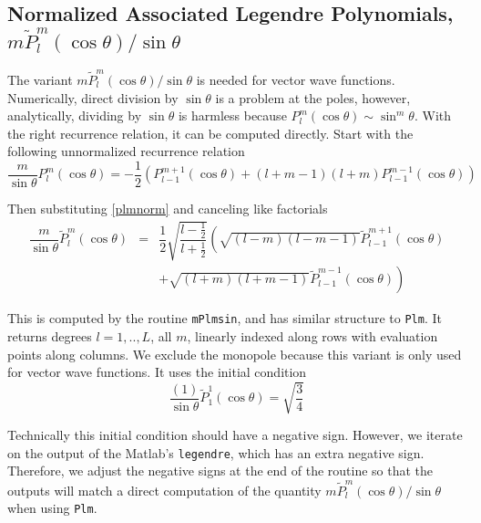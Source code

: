 {\footnotesize
{}
}

\clearpage
{}
\subsection{Normalized Associated Legendre Polynomials, $m\widetilde{P}_l^m(\cos\theta)/\sin\theta $}


The variant $m\widetilde{P}_l^m(\cos\theta)/\sin\theta $ is needed for vector wave functions. Numerically, direct division by $\sin\theta$ is a problem at the poles, however, analytically, dividing by $\sin\theta$ is harmless because $P_l^m(\cos\theta) \sim \sin^m\theta$.  With the right recurrence relation, it can be computed directly.  Start with the following unnormalized recurrence relation
\begin{equation}
\dfrac{m}{\sin\theta}P_l^m(\cos\theta) = -\dfrac{1}{2}\left(P_{l-1}^{m+1}(\cos\theta) + (l+m-1)(l+m)P_{l-1}^{m-1}(\cos\theta) \right) 
\end{equation}

Then substituting \eqref{plmnorm} and canceling like factorials
\begin{eqnarray}
\dfrac{m}{\sin\theta}\widetilde P_l^m(\cos\theta)& =& \dfrac{1}{2}\sqrt{\dfrac{l-\frac{1}{2}}{l+\frac{1}{2}}}\left(\sqrt{(l-m)(l-m-1)}\widetilde P_{l-1}^{m+1}(\cos\theta)\right. \nonumber \\
\ & \ & +\left. \sqrt{(l+m)(l+m-1)}\widetilde P_{l-1}^{m-1}(\cos\theta) \right) 
\end{eqnarray}

This is computed by the routine \texttt{mPlmsin}, and has similar structure to \texttt{Plm}.  It returns degrees $l = 1,..,L$, all $m$, linearly indexed along rows with evaluation points along columns.  We exclude the monopole because this variant is only used for vector wave functions. It uses the initial condition
\begin{equation}
\dfrac{(1)}{\sin\theta}\widetilde P_1^1(\cos\theta) = \sqrt{\dfrac{3}{4}}
\end{equation}

Technically this initial condition should have a negative sign. However, we iterate on the output of the Matlab's \texttt{legendre}, which has an extra negative sign. Therefore, we adjust the negative signs at the end of the routine so that the outputs will match a direct computation of the quantity $m\widetilde{P}_l^m(\cos\theta)/\sin\theta $ when using \texttt{Plm}. 


